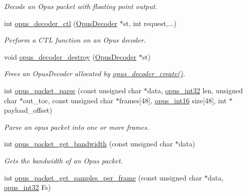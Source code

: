 \begin{DoxyCompactItemize}
\begin{DoxyCompactList}\small\item\em Decode an Opus packet with floating point output. \end{DoxyCompactList}\item 
int \hyperlink{group__opus__decoder_ga2d492844b4f66e7f34d85870f13d4846}{opus\+\_\+decoder\+\_\+ctl} (\hyperlink{group__opus__decoder_ga401d8579958d36094715a6b90cd159a6}{Opus\+Decoder} $\ast$st, int request,...)
\begin{DoxyCompactList}\small\item\em Perform a C\+TL function on an Opus decoder. \end{DoxyCompactList}\item 
void \hyperlink{group__opus__decoder_gafebf4cb3c29c9317cac385446a76e36e}{opus\+\_\+decoder\+\_\+destroy} (\hyperlink{group__opus__decoder_ga401d8579958d36094715a6b90cd159a6}{Opus\+Decoder} $\ast$st)
\begin{DoxyCompactList}\small\item\em Frees an {\ttfamily Opus\+Decoder} allocated by \hyperlink{group__opus__decoder_ga753f6fe0b699c81cfd47d70c8e15a0bd}{opus\+\_\+decoder\+\_\+create()}. \end{DoxyCompactList}\item 
int \hyperlink{group__opus__decoder_ga9d0054936a3345865632b04729cd368c}{opus\+\_\+packet\+\_\+parse} (const unsigned char $\ast$data, \hyperlink{opus__types_8h_aa4d309d6f80b99dbabebc8f98879ab9a}{opus\+\_\+int32} len, unsigned char $\ast$out\+\_\+toc, const unsigned char $\ast$frames\mbox{[}48\mbox{]}, \hyperlink{opus__types_8h_acc9ed7cf60479eb81f9648c6ec27dc26}{opus\+\_\+int16} size\mbox{[}48\mbox{]}, int $\ast$payload\+\_\+offset)
\begin{DoxyCompactList}\small\item\em Parse an opus packet into one or more frames. \end{DoxyCompactList}\item 
int \hyperlink{group__opus__decoder_ga89b9375b6ff5e15f07fdc5d0cf4f0053}{opus\+\_\+packet\+\_\+get\+\_\+bandwidth} (const unsigned char $\ast$data)
\begin{DoxyCompactList}\small\item\em Gets the bandwidth of an Opus packet. \end{DoxyCompactList}\item 
int \hyperlink{group__opus__decoder_gab2a955acced631c6cb7876bbdc7953d4}{opus\+\_\+packet\+\_\+get\+\_\+samples\+\_\+per\+\_\+frame} (const unsigned char $\ast$data, \hyperlink{opus__types_8h_aa4d309d6f80b99dbabebc8f98879ab9a}{opus\+\_\+int32} Fs)

\end{DoxyCompactItemize}
